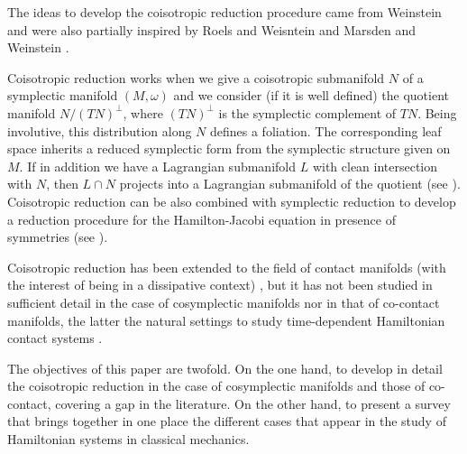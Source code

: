 \documentclass[12pt]{article}
\begin{document}
The ideas to develop the coisotropic reduction procedure came from Weinstein \cite{weinstein1977lectures} and were also partially inspired by Roels and Weisntein \cite{roels} and Marsden and Weinstein \cite{marsden1974reduction}.

Coisotropic reduction works when we give a coisotropic submanifold $N$ of a symplectic manifold $(M, \omega)$ and we consider (if it is well defined) the quotient manifold $N/(TN)^\perp $, where $(TN)^\perp$ is the symplectic complement of $TN$. Being involutive, this distribution along $N$ defines a foliation. The corresponding leaf space inherits a reduced symplectic form from the symplectic structure given on $M$. If in addition we have a Lagrangian submanifold $L$ with clean intersection with $N$, then $L \cap N$ projects into a Lagrangian submanifold of the quotient (see \cites{weinsteincreed, abraham2008foundations}). Coisotropic reduction can be also combined with symplectic reduction to develop a reduction procedure for the Hamilton-Jacobi equation in presence of symmetries (see \cites{vaquero}).

Coisotropic reduction has been extended to the field of contact manifolds (with the interest of being in a dissipative context) \cites{de2019contact, Tortorella2017}, but it has not been studied in sufficient detail in the case of cosymplectic manifolds nor in that of co-contact manifolds, the latter the natural settings to study time-dependent Hamiltonian contact systems \cites{de2022time,de2022time2}.

The objectives of this paper are twofold. On the one hand, to develop in detail the coisotropic reduction in the case of cosymplectic manifolds and those of co-contact, covering a gap in the literature. On the other hand, to present a survey that brings together in one place the different cases that appear in the study of Hamiltonian systems in classical mechanics.
\end{document}

